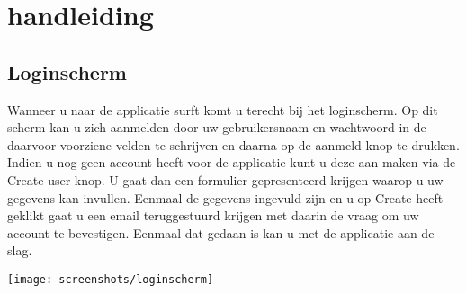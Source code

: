 \documentclass[a4paper,11pt]{article}
\begin{document}
%


\section{handleiding}
\subsection{Loginscherm}
Wanneer u naar de applicatie surft komt u terecht bij het loginscherm. Op dit scherm kan u zich aanmelden door uw gebruikersnaam en wachtwoord in de daarvoor voorziene velden te schrijven en daarna op de aanmeld knop te drukken. Indien u nog geen account heeft voor de applicatie kunt u deze aan maken via de Create user knop. U gaat dan een formulier gepresenteerd krijgen waarop u uw gegevens kan invullen. Eenmaal de gegevens ingevuld zijn en u op Create heeft geklikt gaat u een email teruggestuurd krijgen met daarin de vraag om uw account te bevestigen. Eenmaal dat gedaan is kan u met de applicatie aan de slag.

\begin{center}
\begin{minipage}{\linewidth}
\centering
\texttt{[image: screenshots/loginscherm]}
\end{minipage}
\end{center}
\end{document}
